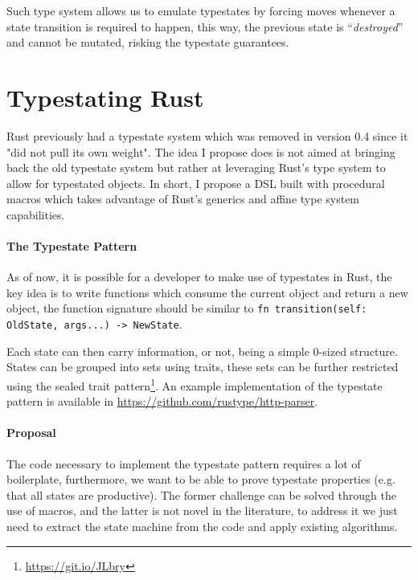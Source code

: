 \documentclass{article}
\begin{document}
Such type system allows us to emulate typestates by forcing moves whenever a state transition is required to happen,
this way, the previous state is “\emph{destroyed}” and cannot be mutated, risking the typestate guarantees.

\section*{Typestating Rust}

Rust previously had a typestate system which was removed in version 0.4 since it "did not pull its own weight".
The idea I propose does is not aimed at bringing back the old typestate system but rather at leveraging Rust's type system to allow for typestated objects.
In short, I propose a DSL built with procedural macros which takes advantage of Rust's generics and affine type system capabilities.

\paragraph{The Typestate Pattern}

As of now, it is possible for a developer to make use of typestates in Rust,
the key idea is to write functions which consume the current object and return a new object,
the function signature should be similar to \texttt{fn transition(self: OldState, args...) -> NewState}.

Each state can then carry information, or not, being a simple 0-sized structure.
States can be grouped into sets using traits,
these sets can be further restricted using the sealed trait pattern\footnote{\url{https://git.io/JLbry}}.
An example implementation of the typestate pattern is available in \url{https://github.com/rustype/http-parser}.


\paragraph{Proposal}

The code necessary to implement the typestate pattern requires a lot of boilerplate,
furthermore, we want to be able to prove typestate properties (e.g. that all states are productive).
The former challenge can be solved through the use of macros,
and the latter is not novel in the literature,
to address it we just need to extract the state machine from the code and apply existing algorithms.
\end{document}
